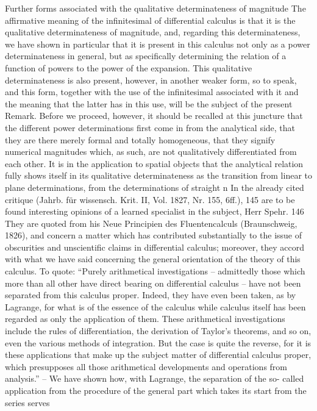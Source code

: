 Further forms associated with the qualitative determinateness of magnitude
The affirmative meaning of the infinitesimal of differential calculus is
that it is the qualitative determinateness of magnitude, and, regarding this
determinateness, we have shown in particular that it is present in this
calculus not only as a power determinateness in general, but as specifically
determining the relation of a function of powers to the power of the
expansion. This qualitative determinateness is also present, however, in
another weaker form, so to speak, and this form, together with the use of
the infinitesimal associated with it and the meaning that the latter has in
this use, will be the subject of the present Remark.
Before we proceed, however, it should be recalled at this juncture that the
different power determinations first come in from the analytical side, that
they are there merely formal and totally homogeneous, that they signify
numerical magnitudes which, as such, are not qualitatively differentiated
from each other. It is in the application to spatial objects that the analytical
relation fully shows itself in its qualitative determinateness as the transition
from linear to plane determinations, from the determinations of straight
n
In the already cited critique (Jahrb. für wissensch. Krit. II, Vol. 1827, Nr. 155, 6ff.), 145 are to be
found interesting opinions of a learned specialist in the subject, Herr Spehr. 146 They are quoted
from his Neue Principien des Fluentencalculs (Braunschweig, 1826), and concern a matter which has
contributed substantially to the issue of obscurities and unscientific claims in differential calculus;
moreover, they accord with what we have said concerning the general orientation of the theory of this
calculus. To quote: “Purely arithmetical investigations – admittedly those which more than all other
have direct bearing on differential calculus – have not been separated from this calculus proper.
Indeed, they have even been taken, as by Lagrange, for what is of the essence of the calculus while
calculus itself has been regarded as only the application of them. These arithmetical investigations
include the rules of differentiation, the derivation of Taylor’s theorems, and so on, even the various
methods of integration. But the case is quite the reverse, for it is these applications that make up the
subject matter of differential calculus proper, which presupposes all those arithmetical developments
and operations from analysis.” – We have shown how, with Lagrange, the separation of the so-
called application from the procedure of the general part which takes its start from the series serves
